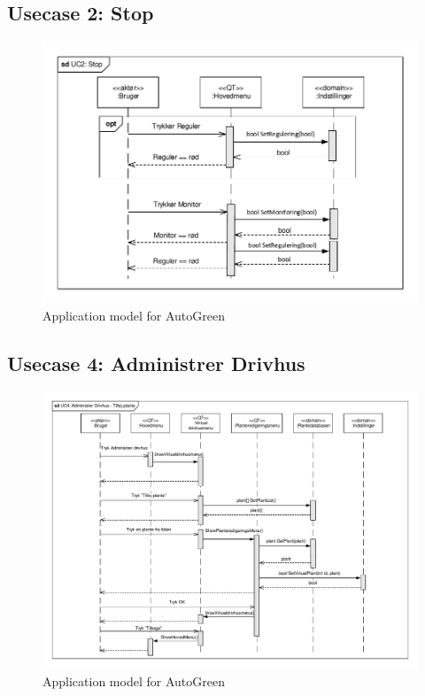 \clearpage

\subsection{Usecase 2: Stop}

\begin{figure}[!h]
\centering 
\includegraphics[width={\textwidth-1cm}, trim=0 0 0 0, clip=true] {../fig/SD_autoGreen_UC_2_Stop.pdf}
\caption{Application model for AutoGreen}
\label{fig:SD_UC2}
\end{figure}

\clearpage

\subsection{Usecase 4: Administrer Drivhus}

\begin{figure}[!h]
\centering 
\includegraphics[width={\textwidth-1cm}, trim=0 0 0 0, clip=true] {../fig/SD_autoGreen_UC_4_Administrerdrivhus.pdf}
\caption{Application model for AutoGreen}
\label{fig:SD_UC4}
\end{figure}

